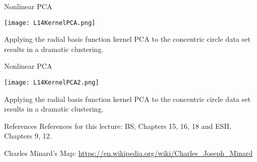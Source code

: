 \documentclass[10pt, table, dvipsnames,xcdraw,handout]{beamer}
\begin{document}
\begin{frame}[fragile]{Nonlinear PCA}
  \begin{minipage}[t][0.5\textheight][t]{\textwidth}
	\centering \texttt{[image: L14KernelPCA.png]} 
  \end{minipage}
  \vfill
\begin{minipage}[t][0.5\textheight][t]{\textwidth}
Applying the radial basis function kernel PCA to the concentric circle data set results in a dramatic clustering.
\end{minipage}
\end{frame}


\begin{frame}[fragile]{Nonlinear PCA}
  \begin{minipage}[t][0.5\textheight][t]{\textwidth}
	\centering \texttt{[image: L14KernelPCA2.png]} 
  \end{minipage}
  \vfill
\begin{minipage}[t][0.5\textheight][t]{\textwidth}
Applying the radial basis function kernel PCA to the concentric circle data set results in a dramatic clustering.
\end{minipage}
\end{frame}





\begin{frame}[fragile]{References}
References for this lecture: BS, Chapters 15, 16, 18 and ESII, Chapters 9, 12.  

Charles Minard's Map:
\url{https://en.wikipedia.org/wiki/Charles_Joseph_Minard}
\end{frame}
\end{document}
